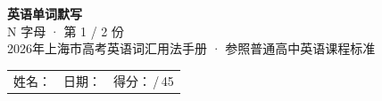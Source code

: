 \documentclass[10pt,a4paper]{article}
\begin{document}
\pagestyle{plain}

\begin{center}
{\LARGE\bfseries 英语单词默写}\\[0.22em]
{\large N 字母 · 第 1 / 2 份}\\[0.18em]
{\small 2026年上海市高考英语词汇用法手册 · 参照普通高中英语课程标准}
\end{center}

\vspace{0.25em}
\noindent\begin{tabular}{@{}p{}@{}p{}@{}p{}@{}}
姓名：\underline{\hspace{2.0cm}} & 日期：\underline{\hspace{2.0cm}} & 得分：\underline{\hspace{1.3cm}}\,/\,45 \\
\end{tabular}

\vspace{0.3em}

\vspace{0.08em}
\end{document}
